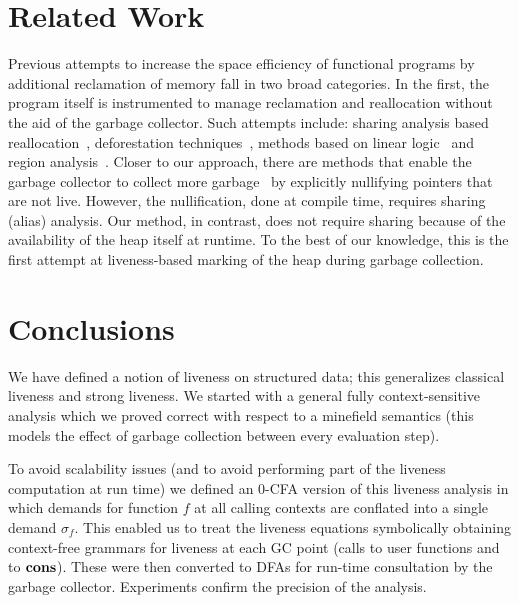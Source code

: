 \documentclass[9pt]{sigplanconf}
\begin{document}
\section{Related Work} Previous attempts to  increase  the space
efficiency
of functional programs by additional  reclamation of memory fall in two
broad categories. In the first,  the program itself is instrumented to
manage  reclamation and reallocation  without the  aid of  the garbage
collector.    Such    attempts   include:   sharing    analysis   based
reallocation~\cite{jones89compile},                       deforestation
techniques~\cite{wadler88deforest,gill93ashort,chitil99deforest},
methods  based  on   linear  logic~\cite{hofmann00linear}  and  region
analysis~\cite{tofte98region}.   Closer  to  our approach,  there  are
methods   that  enable   the   garbage  collector   to  collect   more
garbage~\cite{inoue88analysis,lee05static}   by
explicitly  nullifying  pointers  that  are not  live.   However,  the
nullification,  done   at  compile  time,   requires  sharing  (alias)
analysis.  Our  method, in contrast, does not  require sharing because
of the availability of the heap  itself at runtime.  To the best of our
knowledge, this is the first  attempt at liveness-based marking of the
heap during garbage collection.


\section{Conclusions}
\label{sec:conclusion}
We  have  defined  a  notion  of liveness  on  structured  data;  this
generalizes classical liveness and strong liveness.  We started with a
general fully context-sensitive analysis  which we proved correct with
respect to  a minefield semantics  (this models the effect  of garbage
collection between every evaluation step).

To  avoid scalability  issues (and  to  avoid performing  part of  the
liveness computation at run time)  we defined an 0-CFA version of this
liveness analysis  in which  demands for function  $f$ at  all calling
contexts are conflated into  a single demand $\sigma_f$.  This enabled
us to treat the liveness equations symbolically obtaining context-free
grammars for liveness at each GC point (calls to user functions and to
$\mbox{$\mathbf{cons}$}$).  These were then converted to DFAs for run-time consultation
by  the garbage collector.  Experiments confirm  the precision  of the
analysis.
\end{document}
